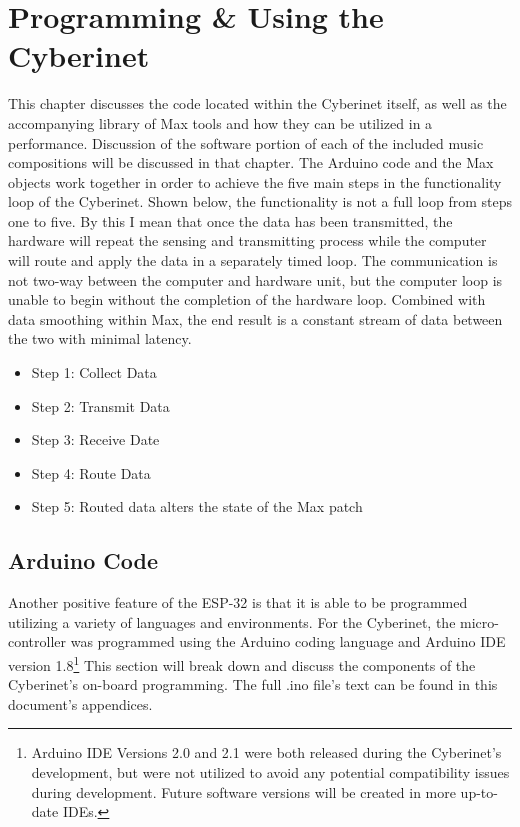\chapter{Programming \& Using the Cyberinet}
This chapter discusses the code located within the Cyberinet itself, as well as the accompanying library of Max tools and how they can be utilized in a performance. Discussion of the software portion of each of the included music compositions will be discussed in that chapter. The Arduino code and the Max objects work together in order to achieve the five main steps in the functionality loop of the Cyberinet. Shown below, the functionality is not a full loop from steps one to five. By this I mean that once the data has been transmitted, the hardware will repeat the sensing and transmitting process while the computer will route and apply the data in a separately timed loop. The communication is not two-way between the computer and hardware unit, but the computer loop is unable to begin without the completion of the hardware loop. Combined with data smoothing within Max, the end result is a constant stream of data between the two with minimal latency. %

\begin{itemize}
    \item Step 1: Collect Data
    \item Step 2: Transmit Data
    \item Step 3: Receive Date
    \item Step 4: Route Data
    \item Step 5: Routed data alters the state of the Max patch
\end{itemize}

\section{Arduino Code}
Another positive feature of the ESP-32 is that it is able to be programmed utilizing a variety of languages and environments. For the Cyberinet, the micro-controller was programmed using the Arduino coding language and Arduino IDE version 1.8\footnote{Arduino IDE Versions 2.0 and 2.1 were both released during the Cyberinet's development, but were not utilized to avoid any potential compatibility issues during development. Future software versions will be created in more up-to-date IDEs.} This section will break down and discuss the components of the Cyberinet's on-board programming. The full .ino file's text can be found in this document's appendices.

